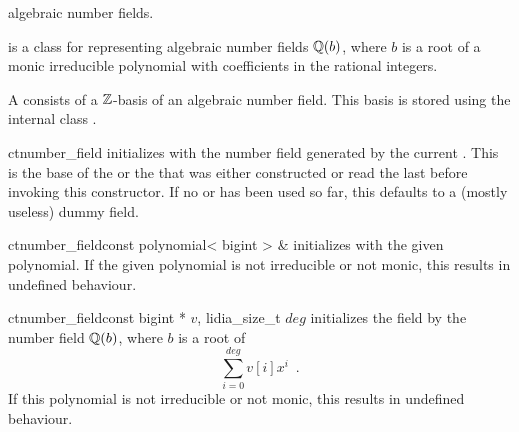 

\NAME

 \dotfill algebraic number fields.



\ABSTRACT

 is a class for representing algebraic number fields $\mathbb{Q}(b)$, where $b$ is
a root of a monic irreducible polynomial with coefficients in the rational integers.



\DESCRIPTION

A  consists of a $\mathbb{Z}$-basis of an algebraic number field.  This basis is
stored using the internal class .



\CONS

\begin{fcode}{ct}{number_field}{}
  initializes with the number field generated by the current .  This is the base of
  the  or the  that was either constructed or read the last
  before invoking this constructor.  If no  or  has been used so
  far, this defaults to a (mostly useless) dummy field.
\end{fcode}

\begin{fcode}{ct}{number_field}{const polynomial< bigint > &}
  initializes with the given polynomial.  If the given polynomial is not irreducible or not
  monic, this results in undefined behaviour.
\end{fcode}

\begin{fcode}{ct}{number_field}{const bigint * $v$, lidia_size_t $\mathit{deg}$}
  initializes the field by the number field $\mathbb{Q}(b)$, where $b$ is a root of
  \begin{displaymath}
    \sum_{i=0}^{\mathit{deg}} v[i]x^i \enspace.
  \end{displaymath}
  If this polynomial is not irreducible or not monic, this results in undefined behaviour.
\end{fcode}

